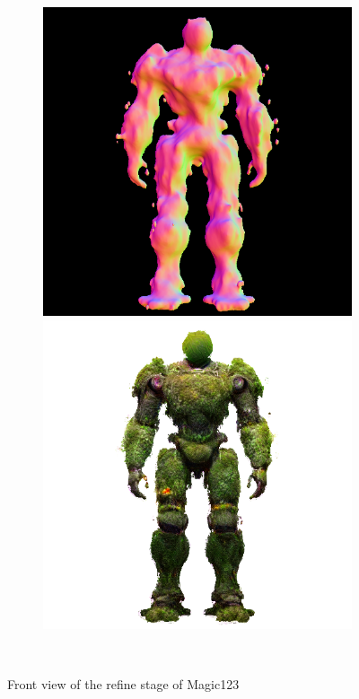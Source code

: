 \begin{figure}[ht]
\begin{subfigure}[b]{0.25\textwidth}
        \caption{}
    \end{subfigure}
    \begin{subfigure}[b]{0.25\textwidth}
        \centering
        \fontsize{9pt}{7pt}\selectfont{}\vspace{.1cm}
        \includegraphics[width=\textwidth]{etc/a robot made out of plants/magic123/magic123_refine_robot_front_10000_part2.png}
        \includegraphics[width=\textwidth]{etc/a robot made out of plants/magic123/magic123_refine_robot_front_10000_part1.png}
        \caption{}
    \end{subfigure}
    \caption{Front view of the refine stage of Magic123}~\label{fig:generationFrontRefineMagic123}
\end{figure}

